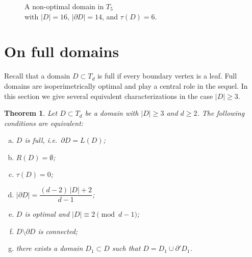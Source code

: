 \documentclass[a4paper, 11pt]{article}
\numberwithin{equation}{section}
\newtheorem{theorem}{Theorem}[section]
\theoremstyle{definition}
\theoremstyle{remark}
\begin{document}
\begin{figure}[H]
\begin{minipage}{0.48\textwidth}
\caption{A non-optimal domain in $T_5$ \\ with $|D|=16$, $|\partial D|=14$, and $\tau(D)=6$.}
\label{figab}
\end{minipage}
\end{figure}


 

\section{On full domains}
\label{sec.fulldomains}

Recall that a domain $D\subset T_d$ is full  if every boundary vertex is a leaf. Full domains are isoperimetrically optimal and play a central role in the sequel. In this section we give several equivalent characterizations in the case $|D|\ge 3$.

\begin{theorem}
Let $D\subset T_d$ be a domain with $|D|\ge 3$ and $d\ge 2$.  
The following conditions are equivalent:
\begin{enumerate}[(a)]
\item $D$ is full, i.e.\ $\partial D = L(D)$;
\item $R(D)=\emptyset$;
\item $\tau(D)=0$;
\item $|\partial D|  =   \dfrac{(d-2)\,|D| + 2}{d-1}$;
\item $D$ is optimal and $|D| \equiv 2 \pmod{d-1}$;
\item $D\setminus \partial D$ is connected;
\item there exists a domain $D_1\subset D$ such that  
      $D = D_1 \cup \partial' D_1$.
\end{enumerate}
\end{theorem}

\medskip 
\end{document}
